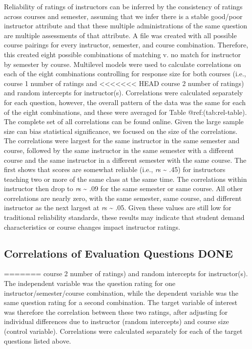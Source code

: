 \documentclass[,man]{apa6}
\theoremstyle{definition}
\theoremstyle{definition}
\theoremstyle{definition}
\theoremstyle{remark}
\begin{document}
Reliability of ratings of instructors can be inferred by the consistency
of ratings across courses and semester, assuming that we infer there is
a stable good/poor instructor attribute and that these multiple
administrations of the same question are multiple assessments of that
attribute. A file was created with all possible course pairings for
every instructor, semester, and course combination. Therefore, this
created eight possible combinations of matching v. no match for
instructor by semester by course. Multilevel models were used to
calculate correlations on each of the eight combinations controlling for
response size for both courses (i.e., course 1 number of ratings and
<<<<<<< HEAD
course 2 number of ratings) and random intercepts for instructor(s).
Correlations were calculated separately for each question, however, the
overall pattern of the data was the same for each of the eight
combinations, and these were averaged for Table @ref:(tab:rel-table).
The complete set of all correlations can be found online. Given the
large sample size can bias statistical significance, we focused on the
size of the correlations. The correlations were largest for the same
instructor in the same semester and course, followed by the same
instructor in the same semester with a different course and the same
instructor in a different semester with the same course. The first shows
that scores are somewhat reliable (i.e., \emph{r}s \textasciitilde{}
.45) for instructors teaching two or more of the same class at the same
time. The correlations within instructor then drop to \emph{r}s
\textasciitilde{} .09 for the same semester or same course. All other
correlations are nearly zero, with the same semester, same course, and
different instructor as the next largest at \emph{r}s \textasciitilde{}
.05. Given these values are still low for traditional reliability
standards, these results may indicate that student demand
characteristics or course changes impact instructor ratings.

\subsection{Correlations of Evaluation Questions
DONE}\label{correlations-of-evaluation-questions-done}
=======
course 2 number of ratings) and random intercepts for instructor(s). The
independent variable was the question rating for one
instructor/semester/course combination, while the dependent variable was
the same question rating for a second combination. The target variable
of interest was therefore the correlation between these two ratings,
after adjusting for individual differences due to instructor (random
intercepts) and course size (control variable). Correlations were
calculated separately for each of the target questions listed above.
\end{document}
